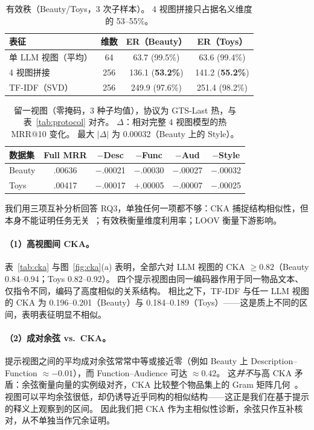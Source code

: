 \documentclass[sigconf,natbib=true,anonymous]{acmart}
\begin{document}
\begin{table}[t]
\centering
\caption{%
有效秩（Beauty/Toys，3 次子样本）。
4 视图拼接只占据名义维度的 53--55\%。%
}
\label{tab:effrank}
\small
\begin{tabular}{@{}lccc@{}}
\toprule
表征 & 维数 & ER（Beauty） & ER（Toys） \\
\midrule
单 LLM 视图（平均） & 64 & 63.7 (99.5\%) & 63.6 (99.4\%) \\
4 视图拼接 & 256 & 136.1 (\textbf{53.2\%}) & 141.2 (\textbf{55.2\%}) \\
TF-IDF（SVD） & 256 & 249.9 (97.6\%) & 251.4 (98.2\%) \\
\bottomrule
\end{tabular}
\end{table}

\begin{table}[t]
\centering
\caption{%
留一视图（零掩码，3 种子均值），协议为 GTS-Last 热，与表~\ref{tab:protocol} 对齐。
$\Delta$：相对完整 4 视图模型的热 MRR@10 变化。
最大 $|\Delta|$ 为 0.00032（Beauty 上的 Style）。%
}
\label{tab:loov}
\small
\setlength{\tabcolsep}{3.5pt}
\begin{tabular}{@{}lccccc@{}}
\toprule
数据集 & Full MRR & $-$Desc & $-$Func & $-$Aud & $-$Style \\
\midrule
Beauty & .00636 & $-$.00021 & $-$.00030 & $-$.00027 & $-$.00032 \\
Toys   & .00417 & $-$.00017 & $+$.00005 & $-$.00007 & $-$.00025 \\
\bottomrule
\end{tabular}
\end{table}

我们用三项互补分析回答 RQ3，单独任何一项都不够：CKA 捕捉结构相似性，但本身不能证明任务无关~\cite{kornblith2019cka}；有效秩衡量维度利用率；LOOV 衡量下游影响。

\paragraph{（1）高视图间 CKA。}
表~\ref{tab:cka} 与图~\ref{fig:cka}(a) 表明，全部六对 LLM 视图的 CKA $\ge 0.82$（Beauty 0.84--0.94；Toys 0.82--0.92）。
四个提示视图由同一编码器作用于同一物品文本、仅指令不同，编码了高度相似的关系结构。
相比之下，TF-IDF 与任一 LLM 视图的 CKA 为 0.196--0.201（Beauty）与 0.184--0.189（Toys）——这是质上不同的区间，表明表征明显不相似。

\paragraph{（2）成对余弦 vs.\ CKA。}
提示视图之间的平均成对余弦常常中等或接近零（例如 Beauty 上 Description--Function $\approx -0.01$），而 Function--Audience 可达 $\approx 0.42$。
这\emph{并不}与高 CKA 矛盾：余弦衡量向量的实例级对齐，CKA 比较整个物品集上的 Gram 矩阵几何~\cite{kornblith2019cka}。
视图可以平均余弦很低，却仍诱导近乎同构的相似结构——这正是我们在基于提示的释义上观察到的区间。
因此我们把 CKA 作为主相似性诊断，余弦只作互补核对，从不单独当作冗余证明。
\end{document}
